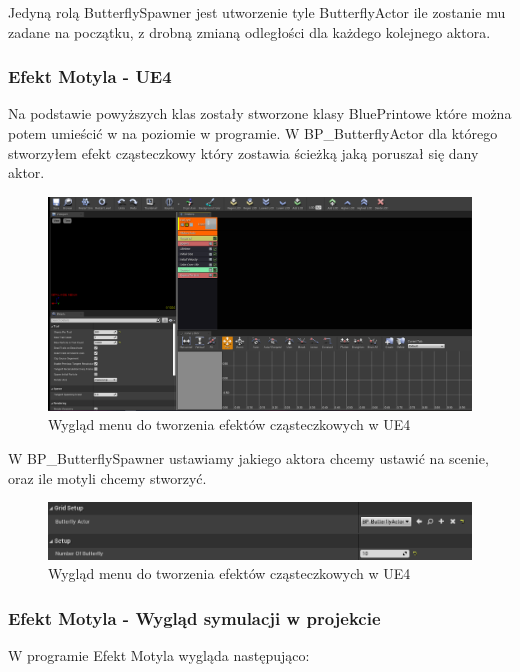 \documentclass[a4paper,12pt,reqno]{article}
\begin{document}


Jedyną rolą ButterflySpawner jest utworzenie tyle ButterflyActor ile zostanie mu zadane na początku, z drobną zmianą odległości dla każdego kolejnego aktora.




\subsubsection{Efekt Motyla - UE4}

Na podstawie powyższych klas zostały stworzone klasy BluePrintowe które można potem umieścić w na poziomie w programie. W BP\_ButterflyActor dla którego stworzyłem efekt cząsteczkowy który zostawia ścieżką jaką poruszał się dany aktor.

\begin{figure}[H]%
\centering
\includegraphics[width=0.7\columnwidth]{graphics/butterfly/ButterflyParticleSystem.png}
\caption{Wygląd menu do tworzenia efektów cząsteczkowych w UE4 
\label{BPExample}}%
%
\qquad
\end{figure} 


W BP\_ButterflySpawner ustawiamy jakiego aktora chcemy ustawić na scenie, oraz ile motyli chcemy stworzyć.

\begin{figure}[H]%
\centering
\includegraphics[width=0.7\columnwidth]{graphics/butterfly/ButterflySpawner.png}
\caption{Wygląd menu do tworzenia efektów cząsteczkowych w UE4 
\label{BPExample}}%
%
\qquad
\end{figure} 



\subsubsection{Efekt Motyla - Wygląd symulacji w projekcie}
W programie Efekt Motyla wygląda następująco:
\end{document}
